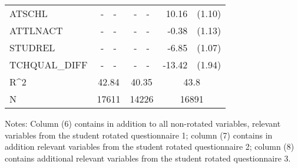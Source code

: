 \documentclass[10pt]{article}
\begin{document}
\begin{table}[H]
\begin{threeparttable}
\begin{tabular}{lrlrlrl}
				ATSCHL & -     & -     & -     & -     & 10.16 & (1.10) \\[0.2em]
				ATTLNACT & -     & -     & -     & -     & -0.38 & (1.13) \\[0.2em]
				STUDREL & -     & -     & -     & -     & -6.85 & (1.07) \\[0.2em]
				TCHQUAL\_DIFF & -     & -     & -     & -     & -13.42 & (1.94) \\[0.2em]								
				R^{2}   & \multicolumn{2}{c}{42.84} & \multicolumn{2}{c}{40.35} & \multicolumn{2}{c}{43.8} \\
				N     & \multicolumn{2}{c}{17611} & \multicolumn{2}{c}{14226} & \multicolumn{2}{c}{16891} \\
				\bottomrule
			\end{tabular}%
			\begin{tablenotes}
				Notes: Column (6) contains in addition to all non-rotated variables, relevant variables from the student rotated questionnaire 1; column (7) contains in addition relevant variables from the student rotated questionnaire 2; column (8) contains additional relevant variables from the student rotated questionnaire 3. 
			\end{tablenotes}
		\end{threeparttable}
	\end{table}%
	
\end{document}
